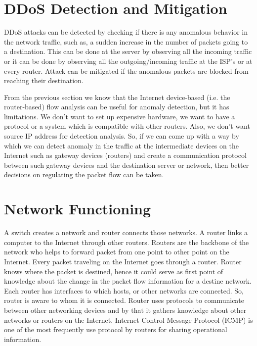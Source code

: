 \documentclass[12pt,oneside,a4paper]{article}
\begin{document}
\pagebreak
\section{DDoS Detection and Mitigation}

DDoS attacks can be detected by checking if there is any anomalous behavior in the network traffic, such as, a sudden increase in the number of packets going to a destination. This can be done at the server by observing all the incoming traffic or it can be done by observing all the outgoing/incoming traffic at the ISP's or at every router. Attack can be mitigated if the anomalous packets are blocked from reaching their destination.

From the previous section we know that the Internet device-based (i.e. the router-based) flow analysis can be useful for anomaly detection, but it has limitations. We don't want to set up expensive hardware, we want to have a protocol or a system which is compatible with other routers. Also, we don't want source IP address for detection analysis. So, if we can come up with a way by which we can detect anomaly in the traffic at the intermediate devices on the Internet such as gateway devices (routers) and create a communication protocol between such gateway devices and the destination server or network, then better decisions on regulating the packet flow can be taken.

\pagebreak
\section{Network Functioning}

A switch creates a network and router connects those networks. A router links a computer to the Internet through other routers. Routers are the backbone of the network who helps to forward packet from one point to other point on the Internet. Every packet traveling on the Internet goes through a router\cite{router-switch}. Router knows where the packet is destined, hence it could serve as first point of knowledge about the change in the packet flow information for a destine network. Each router has interfaces to which hosts, or other networks are connected. So, router is aware to whom it is connected. Router uses protocols to communicate between other networking devices and by that it gathers knowledge about other networks or routers on the Internet.  Internet Control Message Protocol (ICMP)\cite{icmp} is one of the most frequently use protocol by routers for sharing operational information.\par
\end{document}
